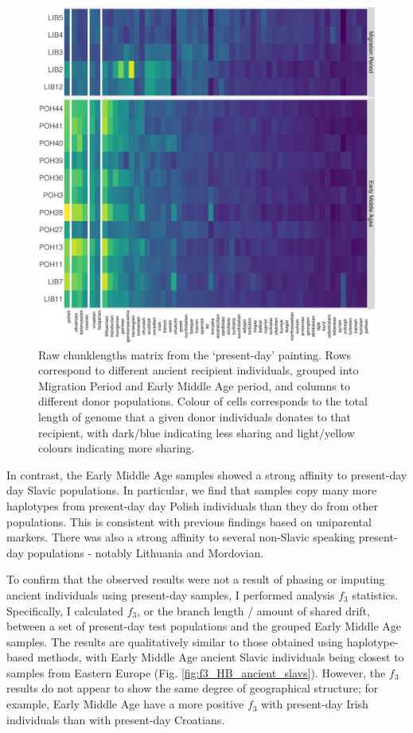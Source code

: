 \begin{figure}[htp]
    \centering
    \includegraphics[width=1.0\textwidth]{../images/chapter5/copymatrix_moderns_ancient_slavs.pdf}
    \caption{Raw chunklengths matrix from the `present-day' painting. Rows correspond to different ancient recipient individuals, grouped into Migration Period and Early Middle Age period, and columns to different donor populations. Colour of cells corresponds to the total length of genome that a given donor individuals donates to that recipient, with dark/blue  indicating less sharing and light/yellow colours indicating more sharing.}
    \label{fig:copymatrix_moderns_ancient_slavs}
\end{figure} 

In contrast, the Early Middle Age samples showed a strong affinity to present-day day Slavic populations. In particular, we find that samples copy many more haplotypes from present-day day Polish individuals than they do from other populations. This is consistent with previous findings based on uniparental markers. There was also a strong affinity to several non-Slavic speaking present-day populations - notably Lithuania and Mordovian. 

To confirm that the observed results were not a result of phasing or imputing ancient individuals using present-day samples, I performed analysis $f_{3}$ statistics. Specifically, I calculated $f_{3}$, or the branch length / amount of shared drift, between a set of present-day test populations and the grouped Early Middle Age samples. The results are qualitatively similar to those obtained using haplotype-based methods, with Early Middle Age ancient Slavic individuals being closest to samples from Eastern Europe (Fig. \ref{fig:f3_HB_ancient_slavs}). However, the $f_{3}$ results do not appear to show the same degree of geographical structure; for example, Early Middle Age have a more positive $f_{3}$ with present-day Irish individuals than with present-day Croatians.

